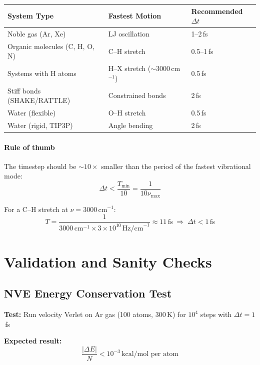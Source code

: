 \documentclass[11pt]{article}
\begin{document}
\begin{center}
\begin{tabular}{lll}
\toprule
System Type & Fastest Motion & Recommended $\Delta t$ \\
\midrule
Noble gas (Ar, Xe) & LJ oscillation & 1--2\,fs \\
Organic molecules (C, H, O, N) & C--H stretch & 0.5--1\,fs \\
Systems with H atoms & H--X stretch ($\sim 3000$\,cm$^{-1}$) & 0.5\,fs \\
Stiff bonds (SHAKE/RATTLE) & Constrained bonds & 2\,fs \\
Water (flexible) & O--H stretch & 0.5\,fs \\
Water (rigid, TIP3P) & Angle bending & 2\,fs \\
\bottomrule
\end{tabular}
\end{center}

\paragraph{Rule of thumb} The timestep should be $\sim 10\times$ smaller than the period of the fastest vibrational mode:
\begin{equation}
\Delta t < \frac{T_{\min}}{10} = \frac{1}{10\nu_{\max}}
\end{equation}

For a C--H stretch at $\nu = 3000$\,cm$^{-1}$:
\begin{equation}
T = \frac{1}{3000\,\text{cm}^{-1} \times 3 \times 10^{10}\,\text{Hz/cm}^{-1}} \approx 11\,\text{fs} \;\Rightarrow\; \Delta t < 1\,\text{fs}
\end{equation}

\section{Validation and Sanity Checks}

\subsection{NVE Energy Conservation Test}

\textbf{Test:} Run velocity Verlet on Ar gas (100 atoms, 300\,K) for $10^4$ steps with $\Delta t = 1$\,fs

\textbf{Expected result:}
\begin{equation}
\frac{|\Delta E|}{N} < 10^{-3}\,\text{kcal/mol per atom}
\end{equation}
\end{document}
